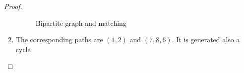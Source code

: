 \begin{proof}
\begin{enumerate}[label=(\roman*)]
\begin{figure}[H]
\begin{center}
                \end{center}                            
                \caption{Bipartite graph and matching}
                \label{t2:p12_BipartiteGraph_Matching.png}                        
            \end{figure}\pn 
         \item
            The corresponding paths are $(1, 2)$ and $(7, 8, 6)$. It is generated also a cycle
    \end{enumerate}
\end{proof}
